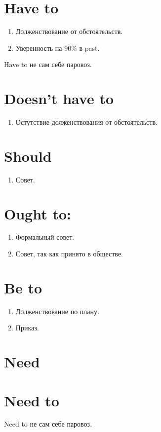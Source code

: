 \documentclass[oneside]{book}
\begin{document}
	\section{Have to}
	\begin{enumerate}
		\item Долженствование от обстоятельств.
		\item Уверенность на 90\% в past.
	\end{enumerate}

	Have to не сам себе паровоз.

	\section{Doesn't have to}
	\begin{enumerate}
		\item Остутствие долженствования от обстоятельств.
	\end{enumerate}

	\section{Should}
	\begin{enumerate}
		\item Совет.
	\end{enumerate}

	\section{Ought to:}
	\begin{enumerate}
		\item Формальный совет.
		\item Совет, так как принято в обществе.
	\end{enumerate}

	\section{Be to}
	\begin{enumerate}
		\item Долженствование по плану.
		\item Приказ.
	\end{enumerate}

	\section{Need}

	\section{Need to}
	Need to не сам себе паровоз.
\end{document}
